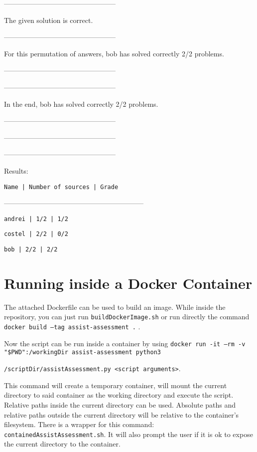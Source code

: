 \documentclass[a4paper,12pt]{article}
\begin{document}
\begin{itemize}
\begin{itemize}
------------------------------------------------

The given solution is correct.

------------------------------------------------

For this permutation of answers, bob has solved correctly 2/2 problems.

------------------------------------------------

------------------------------------------------

In the end, bob has solved correctly 2/2 problems.

------------------------------------------------

------------------------------------------------

------------------------------------------------

Results:

\texttt{Name                          | Number of sources   | Grade}

------------------------------------------------------------

\texttt{andrei                        | 1/2                 | 1/2}

\texttt{costel                        | 2/2                 | 0/2}

\texttt{bob                           | 2/2                 | 2/2}

   
 \end{itemize}
 
\end{itemize}


\section{Running inside a Docker Container}

The attached Dockerfile can be used to build an image. While inside the repository, you can just run \texttt{buildDockerImage.sh} or run directly the command \texttt{docker build --tag assist-assessment .} .

Now the script can be run inside a container by using \texttt{docker run -it --rm -v "\$PWD":/workingDir assist-assessment python3} 

\texttt{/scriptDir/assistAssessment.py <script arguments>}.

This command will create a temporary container, will mount the current directory to said container as the working directory and execute the script. Relative paths inside the current directory can be used. Absolute paths and relative paths outside the current directory will be relative to the container's filesystem.
There is a wrapper for this command: \texttt{containedAssistAssessment.sh}. It will also prompt the user if it is ok to expose the current directory to the container.
\end{document}
